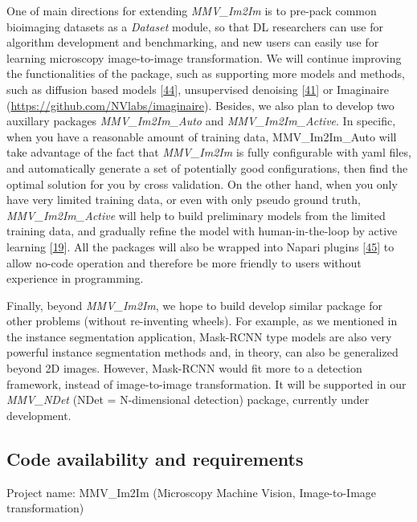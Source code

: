 One of main directions for extending \emph{MMV\_Im2Im} is to pre-pack common bioimaging datasets as a \emph{Dataset} module, so that DL researchers can use for algorithm development and benchmarking, and new users can easily use for learning microscopy image-to-image transformation. We will continue improving the functionalities of the package, such as supporting more models and methods, such as diffusion based models {[}\protect\hyperlink{ref-1A3yurr7m}{44}{]}, unsupervised denoising {[}\protect\hyperlink{ref-4vnyY9J9}{41}{]} or Imaginaire (\url{https://github.com/NVlabs/imaginaire}). Besides, we also plan to develop two auxillary packages \emph{MMV\_Im2Im\_Auto} and \emph{MMV\_Im2Im\_Active}. In specific, when you have a reasonable amount of training data, MMV\_Im2Im\_Auto will take advantage of the fact that \emph{MMV\_Im2Im} is fully configurable with yaml files, and automatically generate a set of potentially good configurations, then find the optimal solution for you by cross validation. On the other hand, when you only have very limited training data, or even with only pseudo ground truth, \emph{MMV\_Im2Im\_Active} will help to build preliminary models from the limited training data, and gradually refine the model with human-in-the-loop by active learning {[}\protect\hyperlink{ref-jM3v1UjQ}{19}{]}. All the packages will also be wrapped into Napari plugins {[}\protect\hyperlink{ref-YEMgt2T4}{45}{]} to allow no-code operation and therefore be more friendly to users without experience in programming.

Finally, beyond \emph{MMV\_Im2Im}, we hope to build develop similar package for other problems (without re-inventing wheels). For example, as we mentioned in the instance segmentation application, Mask-RCNN type models are also very powerful instance segmentation methods and, in theory, can also be generalized beyond 2D images. However, Mask-RCNN would fit more to a detection framework, instead of image-to-image transformation. It will be supported in our \emph{MMV\_NDet} (NDet = N-dimensional detection) package, currently under development.

\hypertarget{code-availability-and-requirements}{%
\subsection{Code availability and requirements}\label{code-availability-and-requirements}}

Project name: MMV\_Im2Im (Microscopy Machine Vision, Image-to-Image transformation)

